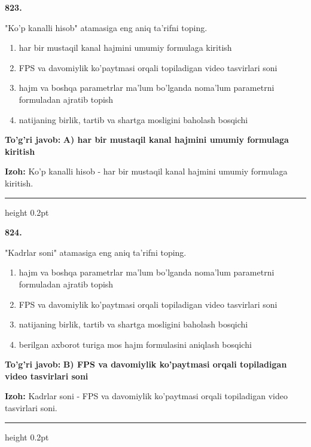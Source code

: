 \documentclass[10pt,a4paper,oneside]{article}
\begin{document}
\noindent\textbf{\color{ink}823.}
\par
"Ko'p kanalli hisob" atamasiga eng aniq ta'rifni toping.
\begin{enumerate}[label=\Alph*),leftmargin=9mm]
\item har bir mustaqil kanal hajmini umumiy formulaga kiritish
\item FPS va davomiylik ko'paytmasi orqali topiladigan video tasvirlari soni
\item hajm va boshqa parametrlar ma'lum bo'lganda noma'lum parametrni formuladan ajratib topish
\item natijaning birlik, tartib va shartga mosligini baholash bosqichi
\end{enumerate}
\begin{tcolorbox}[enhanced,breakable,colback=teal!4,colframe=teal!50!black,boxrule=0.5pt,arc=1.1mm,left=3mm,right=3mm,top=1.7mm,bottom=1.7mm,before skip=2mm,after skip=2mm]
\textbf{\color{teal}To'g'ri javob:} \textbf{A) har bir mustaqil kanal hajmini umumiy formulaga kiritish}
\par\smallskip
\textbf{Izoh:} Ko'p kanalli hisob - har bir mustaqil kanal hajmini umumiy formulaga kiritish.
\end{tcolorbox}
\vspace{2mm}\hrule height 0.2pt \vspace{3mm}

\noindent\textbf{\color{ink}824.}
\par
"Kadrlar soni" atamasiga eng aniq ta'rifni toping.
\begin{enumerate}[label=\Alph*),leftmargin=9mm]
\item hajm va boshqa parametrlar ma'lum bo'lganda noma'lum parametrni formuladan ajratib topish
\item FPS va davomiylik ko'paytmasi orqali topiladigan video tasvirlari soni
\item natijaning birlik, tartib va shartga mosligini baholash bosqichi
\item berilgan axborot turiga mos hajm formulasini aniqlash bosqichi
\end{enumerate}
\begin{tcolorbox}[enhanced,breakable,colback=teal!4,colframe=teal!50!black,boxrule=0.5pt,arc=1.1mm,left=3mm,right=3mm,top=1.7mm,bottom=1.7mm,before skip=2mm,after skip=2mm]
\textbf{\color{teal}To'g'ri javob:} \textbf{B) FPS va davomiylik ko'paytmasi orqali topiladigan video tasvirlari soni}
\par\smallskip
\textbf{Izoh:} Kadrlar soni - FPS va davomiylik ko'paytmasi orqali topiladigan video tasvirlari soni.
\end{tcolorbox}
\vspace{2mm}\hrule height 0.2pt \vspace{3mm}
\end{document}
